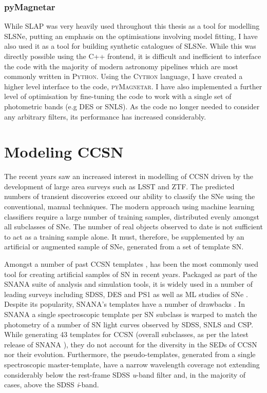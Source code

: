 \subsubsection{pyMagnetar}
While SLAP was very heavily used throughout this thesis as a tool for modelling SLSNe, putting an emphasis on the optimisations involving model fitting, I have also used it as a tool for building synthetic catalogues of SLSNe. While this was directly possible using the C++ frontend, it is difficult and inefficient to interface the code with the majority of modern astronomy pipelines which are most commonly written in \textsc{Python}. Using the \textsc{Cython} language, I have created a higher level interface to the code, \textsc{pyMagnetar}. I have also implemented a further level of optimisation by fine-tuning the code to work with a single set of photometric bands (e.g DES or SNLS). As the code no longer needed to consider any arbitrary filters, its performance has increased considerably.

\section{Modeling CCSN}
The recent years saw an increased interest in modelling of CCSN driven by the development of large area surveys such as LSST and ZTF. The predicted numbers of transient discoveries exceed our ability to classify the SNe using the conventional, manual techniques. The modern approach using machine learning classifiers require a large number of training samples, distributed evenly amongst all subclasses of SNe. The number of real objects observed to date is not sufficient to act as a training sample alone. It must, therefore, be supplemented by an artificial or augmented sample of SNe, generated from a set of template SN.

Amongst a number of past CCSN templates \citep{Schlegel1995,Nugent2006}, \citet{Kessler2009} has been the most commonly used tool for creating artificial samples of SN in recent years. Packaged as part of the \textsc{SNANA} suite of analysis and simulation tools, it is widely used in a number of leading surveys including SDSS, DES and PS1 as well as ML studies of SNe \citep{Kessler2010,Lochner2016}. Despite its popularity, \textsc{SNANA}'s templates have a number of drawbacks \citep{Kessler2010}. In \textsc{SNANA} a single spectroscopic template per SN subclass \citep[Taken from]{Nugent2006} is warped to match the photometry of a number of SN light curves observed by SDSS, SNLS and CSP. While generating 43 templates for CCSN (overall subclasses, as per the latest release of \textsc{SNANA} \citep{Jones2016}), they do not account for the diversity in the SEDs of CCSN nor their evolution. Furthermore, the pseudo-templates, generated from a single spectroscopic master-template, have a narrow wavelength coverage not extending considerably below the rest-frame SDSS \textit{u}-band filter and, in the majority of cases, above the SDSS \textit{i}-band.

